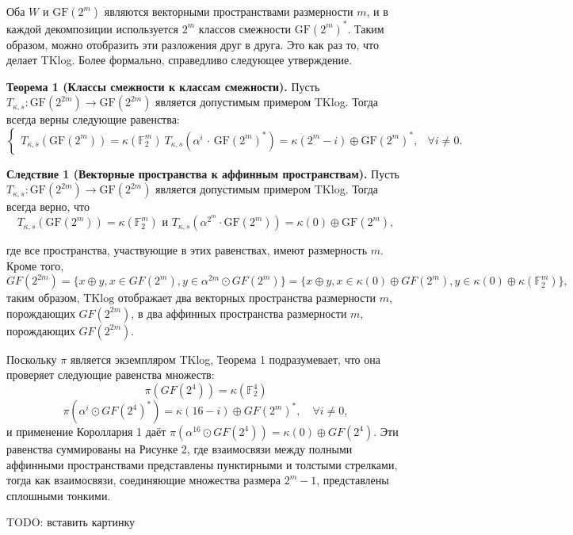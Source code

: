 Оба \(W\) и \(\mathrm{GF}(2^m)\) являются векторными пространствами размерности \(m\), и в каждой декомпозиции используется \(2^m\) классов смежности \(\mathrm{GF}(2^m)^*\). Таким образом, можно отобразить эти разложения друг в друга. Это как раз то, что делает TKlog. Более формально, справедливо следующее утверждение.

\textbf{Теорема 1 (Классы смежности к классам смежности).} Пусть \(T_{\kappa,s} : \mathrm{GF}(2^{2m}) \to \mathrm{GF}(2^{2m})\) является допустимым примером TKlog. Тогда всегда верны следующие равенства:
\[
\begin{cases}
T_{\kappa,s}(\mathrm{GF}(2^m)) = \kappa(\mathbb{F}_2^m) \
T_{\kappa,s}(\alpha^i \, \cdot \, \mathrm{GF}(2^m)^*) = \kappa(2^m - i) \oplus \mathrm{GF}(2^m)^*, & \forall i \neq 0.
\end{cases}
\]

\textbf{Следствие 1 (Векторные пространства к аффинным пространствам).} Пусть \(T_{\kappa,s} : \mathrm{GF}(2^{2m}) \to \mathrm{GF}(2^{2m})\) является допустимым примером TKlog. Тогда всегда верно, что
\[
T_{\kappa,s}(\mathrm{GF}(2^m)) = \kappa(\mathbb{F}_2^m) \text{ и } T_{\kappa,s}(\alpha^{2^m} \cdot \mathrm{GF}(2^m)) = \kappa(0) \oplus \mathrm{GF}(2^m),
\]

где все пространства, участвующие в этих равенствах, имеют размерность \( m \). Кроме того,
\[
GF(2^{2m}) = \{ x \oplus y, x \in GF(2^m), y \in \alpha^{2m} \odot GF(2^m) \}
= \{ x \oplus y, x \in \kappa(0) \oplus GF(2^m), y \in \kappa(0) \oplus \kappa (\mathbb{F}_{2}^{m}) \},
\]
таким образом, \( \text{TKlog} \) отображает два векторных пространства размерности \( m \), порождающих \( GF(2^{2m}) \), в два аффинных пространства размерности \( m \), порождающих \( GF(2^{2m}) \).

Поскольку \( \pi \) является экземпляром TKlog, Теорема 1 подразумевает, что она проверяет следующие равенства множеств:
\[
\pi\left( GF(2^4) \right) = \kappa(\mathbb{F}_{2}^{4})
\]
\[
\pi\left( \alpha^i \odot GF(2^4)^{\ast} \right) = \kappa(16 - i) \oplus GF(2^m)^{\ast}, \quad \forall i \neq 0,
\]
и применение Короллария 1 даёт \(\pi(\alpha^{16} \odot GF(2^4)) = \kappa(0) \oplus GF(2^4)\). Эти равенства суммированы на Рисунке 2, где взаимосвязи между полными аффинными пространствами представлены пунктирными и толстыми стрелками, тогда как взаимосвязи, соединяющие множества размера \(2^m - 1\), представлены сплошными тонкими.

TODO: вставить картинку

